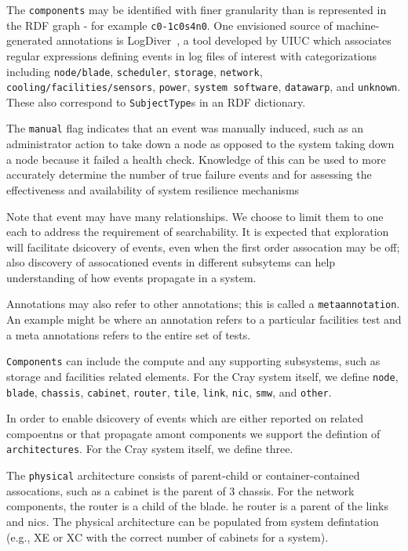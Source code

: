 The \texttt{components} may be identified with finer granularity than
is represented in the RDF graph - for example \texttt{c0-1c0s4n0}. One 
envisioned source of machine-generated annotations is LogDiver~\cite{LogDiver}, 
a tool developed by UIUC which associates regular expressions defining
events in log files of interest with categorizations including 
\texttt{node/blade},
\texttt{scheduler}, \texttt{storage}, \texttt{network}, \texttt{cooling/facilities/sensors},
\texttt{power}, \texttt{system software}, \texttt{datawarp}, and \texttt{unknown}.
These also correspond to \texttt{SubjectType}s in an RDF dictionary.

The \texttt{manual} flag indicates that an event was manually induced,
such as an administrator action to take down a node as opposed
to the system taking down a node because it failed a health check.
Knowledge of this can be used to more accurately determine the
number of true failure events and for assessing the effectiveness
and availability of system resilience mechanisms


Note that event may have many relationships. We choose to limit them to one each to address
the requirement of searchability. It is expected that exploration will facilitate dsicovery
of events, even when the first order assocation may be off; also discovery of assocationed
events in different subsytems can help understanding of how events propagate in a system.

Annotations may also refer to other annotations; this is called a \texttt{metaannotation}.
An example might be where an annotation refers to a particular facilities
test and a meta annotations refers to the entire set of tests.

\texttt{Components} can include the compute and any supporting subsystems,
such as storage and facilities related elements. For the Cray system
itself, we define \texttt{node}, \texttt{blade}, \texttt{chassis},
\texttt{cabinet}, \texttt{router}, \texttt{tile}, \texttt{link}, \texttt{nic},
\texttt{smw}, and \texttt{other}.

In order to enable dsicovery of events which are either reported on related
compoentns or that propagate amont components we support the defintion
of \texttt{architectures}. For the Cray system itself, we define three.

The \texttt{physical} architecture consists of parent-child or
container-contained assocations, such as a cabinet is the parent of
3 chassis. For the network components, the router is a child of the blade.
he router is a parent of the links and nics. The physical architecture
can be populated from system defintation (e.g., XE or XC with the
correct number of cabinets for a system).

